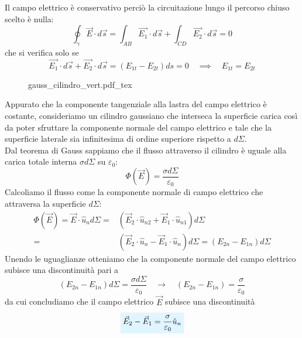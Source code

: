 \documentclass[x11names]{report}
\newcommand{\incfig}[1]{%
	{#1.pdf_tex}
}
\newcommand{\viola}[1]{%
	\colorbox{myblue}{$\displaystyle #1$}
}
\begin{document}
Il campo elettrico è conservativo perciò la circuitazione lungo il percorso chiuso scelto è nulla:
\[
\oint_\gamma \vec{E}\cdot d\vec{s} = \int_{AB} \vec{E_1}\cdot d\vec{s} + \int_{CD}  \vec{E_2}\cdot  d\vec{s} = 0
\]
che si verifica solo se
\[
\vec{E_1}\cdot  d\vec{s} + \vec{E_2}\cdot  d\vec{s} =( E_{1t}  - E_{2t})ds = 0 \quad \implies \quad  E_{1t} = E_{2t}
\]
\begin{wrapfigure}{l}{0.3\textwidth}
	\incfig{gauss_cilindro_vert}
\end{wrapfigure}
Appurato che la componente tangenziale alla lastra del campo elettrico è costante, consideriamo un cilindro gaussiano che interseca la superficie carica così da poter sfruttare la componente normale del campo elettrico e tale che la superficie laterale sia infinitesima di ordine superiore rispetto a \(d\Sigma\). \\

Dal teorema di Gauss sappiamo che il flusso attraverso il cilindro è uguale alla carica totale interna
\(\sigma d\Sigma\) su \(\varepsilon_0\):
\[
\Phi(\vec{E}) = \frac{\sigma d\Sigma}{\varepsilon_0}
\]
Calcoliamo il flusso come la componente normale di campo elettrico che attraversa la superficie \(d\Sigma\):
\begin{align*}
	\Phi(\vec{E}) = \vec{E}\cdot \hat{u}_n  d\Sigma =& \left(\vec{E}_2\cdot\hat{u}_{n2} + \vec{E}_1\cdot\hat{u}_{n1} \right) d\Sigma\\ =& \left(\vec{E}_2\cdot\hat{u}_{n} - \vec{E}_1\cdot\hat{u}_{n} \right) d\Sigma = \left(E_{2n} - E_{1n}\right)d\Sigma
\end{align*}
Unendo le uguaglianze otteniamo che la componente normale del campo elettrico subisce una discontinuità pari a 
\[
\left(E_{2n} - E_{1n}\right)d\Sigma = \frac{\sigma d\Sigma}{\varepsilon_0} \quad \to \quad \left(E_{2n} - E_{1n}\right) = \frac{\sigma}{\varepsilon_0}
\]
da cui concludiamo che il campo elettrico \(\vec{E}\) subisce una discontinuità 
\begin{equation}
 	\viola{\vec{E}_{2} - \vec{E}_{1} = \frac{\sigma}{\varepsilon_0}\hat{u}_n}
\end{equation}
\end{document}
